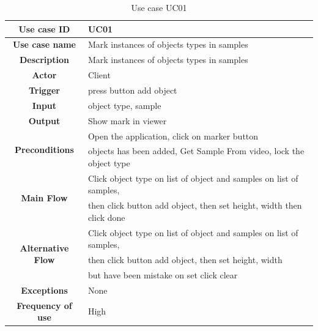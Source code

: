 \begin{table}[H]
  \begin{center}
    \begin{tabular}{ | c | l | } 
    \hline
    \textbf{Use case ID} & UC01 \\
    \hline
    \textbf{Use case name} & Mark instances of objects types in samples \\
    \hline
    \textbf{Description} & Mark instances of objects types in samples \\
    \hline
    \textbf{Actor} & Client \\
    \hline
    \textbf{Trigger} & press button add object \\
    \hline
    \textbf{Input} & object type, sample \\
    \hline
    \textbf{Output} & Show mark in viewer \\
    \hline    
    \multirow{2}{4em}{\textbf{Preconditions}} & Open the application, click on marker button\\ 
    & objects has been added, Get Sample From video, lock the object type \\
    \hline
    \multirow{2}{4em}{\textbf{Main Flow}}  & Click object type on list of object and samples on list of samples,\\
    & then click button add object, then set height, width then click done \\
    \hline
    \multirow{3}{4em}{\textbf{Alternative Flow}} & Click object type on list of object and samples on list of samples,\\
    & then click button add object, then set height, width \\
    & but have been mistake on set click clear \\
    \hline
    \textbf{Exceptions} & None \\
    \hline
    \textbf{Frequency of use} & High \\
    \hline
    \end{tabular}
  \end{center}
  \caption{Use case UC01}\label{tab:uc1}
\end{table}

